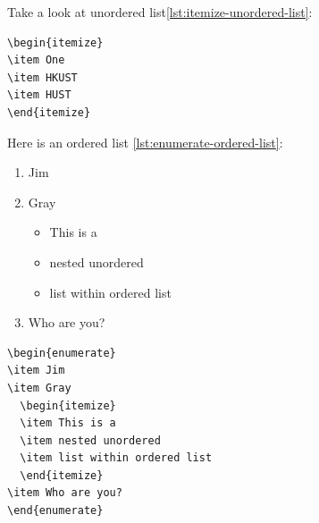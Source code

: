 Take a look at unordered list\ref{lst:itemize-unordered-list}:

\begin{minipage}{.4\linewidth}
\begin{lstlisting}[label={lst:itemize-unordered-list},linewidth=.7\textwidth]
\begin{itemize}
\item One
\item HKUST
\item HUST
\end{itemize}
\end{lstlisting}  
\end{minipage}
\hfill
{}

Here is an ordered list \ref{lst:enumerate-ordered-list}:

\begin{minipage}{.4\linewidth}
  \begin{enumerate}
  \item Jim
  \item Gray
    \begin{itemize}
    \item This is a
    \item nested unordered
    \item list within ordered list
    \end{itemize}
  \item Who are you?
  \end{enumerate}
\end{minipage}
\hfill{}
\begin{minipage}{.4\linewidth}
\begin{lstlisting}[label={lst:enumerate-ordered-list}]
\begin{enumerate}
\item Jim
\item Gray
  \begin{itemize}
  \item This is a
  \item nested unordered
  \item list within ordered list
  \end{itemize}
\item Who are you?
\end{enumerate}
\end{lstlisting}
\end{minipage}

